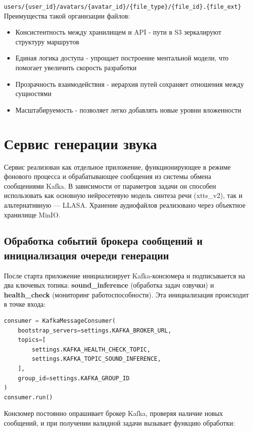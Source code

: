 \texttt{users/\{user\_id\}/avatars/\{avatar\_id\}/\{file\_type\}/\{file\_id\}.\{file\_ext\}}\newline
Преимущества такой организации файлов:
\begin{itemize}
    \item Консистентность между хранилищем и API - пути в S3 зеркалируют структуру маршрутов
    \item Единая логика доступа - упрощает построение ментальной модели, что помогает увеличить скорость разработки
    \item Прозрачность взаимодействия - иерархия путей сохраняет отношения между сущностями
    \item Масштабируемость - позволяет легко добавлять новые уровни вложенности
\end{itemize}


\section{Сервис генерации звука}

Сервис реализован как отдельное приложение, функционирующее в режиме
фонового процесса и обрабатывающее сообщения из системы обмена сообщениями
Kafka. В зависимости от параметров задачи он способен использовать как
основную нейросетевую модель синтеза речи (xtts\_v2), так и альтернативную — LLASA.
Хранение аудиофайлов реализовано через объектное хранилище MinIO.

\subsection{Обработка событий брокера сообщений и инициализация очереди генерации}
После старта приложение инициализирует Kafka-консюмера и подписывается
на два ключевых топика: \textbf{sound\_inference} (обработка задач озвучки)
и \textbf{health\_check} (мониторинг работоспособности). Эта инициализация
происходит в точке входа:

\begin{lstlisting}[language=Python, numbers=none, frame=none]
consumer = KafkaMessageConsumer(
    bootstrap_servers=settings.KAFKA_BROKER_URL,
    topics=[
        settings.KAFKA_HEALTH_CHECK_TOPIC,
        settings.KAFKA_TOPIC_SOUND_INFERENCE,
    ],
    group_id=settings.KAFKA_GROUP_ID
)
consumer.run()
\end{lstlisting}

Консюмер постоянно опрашивает брокер Kafka, проверяя наличие новых сообщений,
и при получении валидной задачи вызывает функцию обработки:

